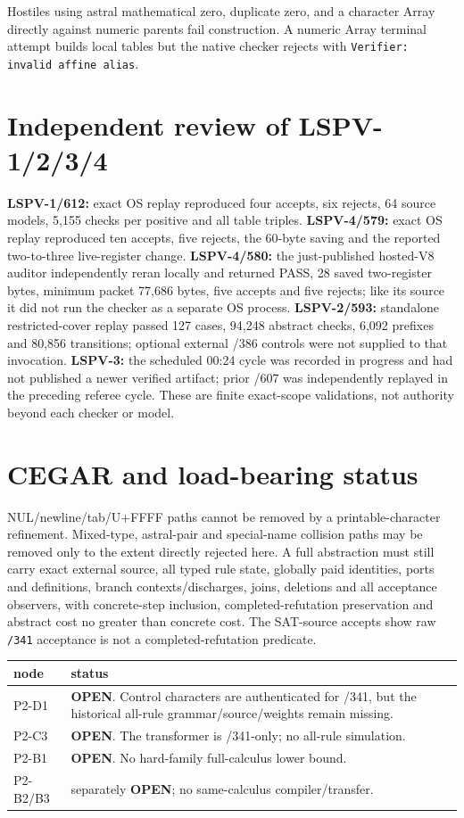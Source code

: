 \documentclass[11pt]{article}
\begin{document}
Hostiles using astral mathematical zero, duplicate zero, and a character
Array directly against numeric parents fail construction.  A numeric Array
terminal attempt builds local tables but the native checker rejects with
\texttt{Verifier: invalid affine alias}.

\section*{Independent review of LSPV-1/2/3/4}
\textbf{LSPV-1/612:} exact OS replay reproduced four accepts, six rejects,
64 source models, 5,155 checks per positive and all table triples.
\textbf{LSPV-4/579:} exact OS replay reproduced ten accepts, five rejects,
the 60-byte saving and the reported two-to-three live-register change.
\textbf{LSPV-4/580:} the just-published hosted-V8 auditor independently
reran locally and returned PASS, 28 saved two-register bytes, minimum packet
77,686 bytes, five accepts and five rejects; like its source it did not run
the checker as a separate OS process.
\textbf{LSPV-2/593:} standalone restricted-cover replay passed 127 cases,
94,248 abstract checks, 6,092 prefixes and 80,856 transitions; optional
external /386 controls were not supplied to that invocation.
\textbf{LSPV-3:} the scheduled 00:24 cycle was recorded in progress and had
not published a newer verified artifact; prior /607 was independently
replayed in the preceding referee cycle.  These are finite exact-scope
validations, not authority beyond each checker or model.

\section*{CEGAR and load-bearing status}
NUL/newline/tab/U+FFFF paths cannot be removed by a printable-character
refinement.  Mixed-type, astral-pair and special-name collision paths may be
removed only to the extent directly rejected here.  A full abstraction must
still carry exact external source, all typed rule state, globally paid
identities, ports and definitions, branch contexts/discharges, joins,
deletions and all acceptance observers, with concrete-step inclusion,
completed-refutation preservation and abstract cost no greater than concrete
cost.  The SAT-source accepts show raw \texttt{/341} acceptance is not a
completed-refutation predicate.

\begin{center}
\begin{tabular}{p{.15\linewidth}p{.74\linewidth}}\toprule
node & status\\\midrule
P2-D1 & \textbf{OPEN}. Control characters are authenticated for /341, but
the historical all-rule grammar/source/weights remain missing.\\
P2-C3 & \textbf{OPEN}. The transformer is /341-only; no all-rule simulation.\\
P2-B1 & \textbf{OPEN}. No hard-family full-calculus lower bound.\\
P2-B2/B3 & separately \textbf{OPEN}; no same-calculus compiler/transfer.\\
\bottomrule\end{tabular}
\end{center}
\end{document}
